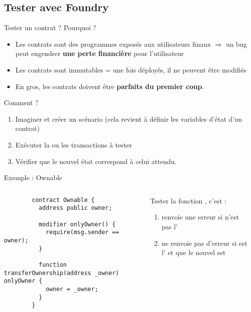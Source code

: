 \subsection{Tester avec Foundry}

\begin{frame}{Tester un contrat ?}
  Pourquoi ?

  \begin{itemize}
    \item Les contrats sont des programmes exposés aux utilisateurs finaux $\Rightarrow$ un bug peut engendrer \textbf{une perte financière} pour l'utilisateur
    \item Les contrats sont immutables = une fois déployés, il ne peuvent être modifiés
    \item En gros, les contrats doivent être \textbf{parfaits du premier coup}.
  \end{itemize}

  Comment ?

  \begin{enumerate}
    \item Imaginer et créer un scénario (cela revient à définir les variables d'état d'un contrat)
    \item Exécuter la ou les transactions à tester
    \item Vérifier que le nouvel état correspond à celui attendu.
  \end{enumerate}
\end{frame}

\begin{frame}[fragile]{Exemple : Ownable}
  \begin{columns}
    \begin{column}{0.47\textwidth}
      \begin{verbatim}
        contract Ownable {
          address public owner;
    
          modifier onlyOwner() {
            require(msg.sender == owner);
          }
    
          function transferOwnership(address _owner) onlyOwner {
            owner = _owner;
          }
        }      
      \end{verbatim}
    \end{column}

    \begin{column}{0.47\textwidth}
      Tester la fonction , c'est :

      \begin{enumerate}
        \item {} renvoie une erreur si  n'est pas l'
        \item {} ne renvoie pas d'erreur si  est l' et que le nouvel  est 
      \end{enumerate}
    \end{column}
  \end{columns}
\end{frame}

